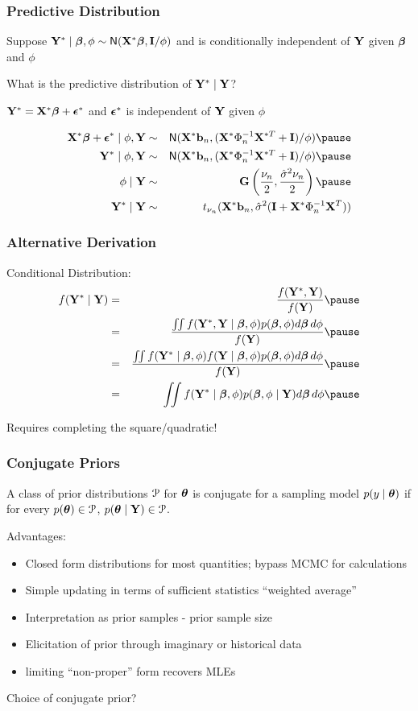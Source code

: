 \documentclass[handout]{beamer}
\begin{document}
\begin{frame}
  \frametitle{Predictive Distribution}
Suppose $\mathbf{Y}^* \mid \boldsymbol{\beta}, \phi \sim \textsf{N}(\mathbf{X}^* \boldsymbol{\beta} , \mathbf{I}/\phi)$  and is conditionally
independent of $\mathbf{Y}$ given $\boldsymbol{\beta}$ and $\phi$ \pause
\vspace{18pt}

What is the predictive distribution of $\mathbf{Y}^* \mid \mathbf{Y}$? \pause

\vspace{18pt}
$\mathbf{Y}^* = \mathbf{X}^* \boldsymbol{\beta} + \boldsymbol{\epsilon}^*$ and $\boldsymbol{\epsilon}^*$ is independent of $\mathbf{Y}$ given
$\phi$ \pause

\begin{eqnarray*}
\X^* \b + \eps^* \mid \phi, \Y & \sim & \N(\X^*\bv_n, (\X^{*} \Phi_n^{-1} \X^{*T}
+ \I)/\phi)  \pause \\
\Y^* \mid \phi, \Y & \sim & \N(\X^*\bv_n, (\X^{*} \Phi_n^{-1} \X^{*T}
+ \I)/\phi)  \pause \\
\phi \mid \Y & \sim & \G\left(\frac{\nu_n}{2},
  \frac{\shat \nu_n}{ 2} \right)  \pause \\
\Y^* \mid \Y & \sim & t_{\nu_n}( \X^*\bv_n, \shat (\I + \X^* \Phi_n^{-1} \X^T))
\end{eqnarray*}
\end{frame}
\begin{frame}
  \frametitle{Alternative Derivation}
Conditional Distribution:
\begin{eqnarray*}
f(\Y^* \mid \Y) & = & \frac{f(\Y^*, \Y)}{f(\Y)} \pause \\
 & = & \frac{
\iint f(\Y^*, \Y \mid \b, \phi) p(\b, \phi) d\b\, d\phi
}
{
  f(\Y)
}  \pause \\
 & = & \frac{
\iint f(\Y^*\mid \b, \phi) f(\Y \mid \b, \phi) p(\b, \phi) d\b\, d\phi
}
{
  f(\Y)
}  \pause \\
 & = &
\iint f(\Y^*\mid \b, \phi)  p(\b, \phi \mid \Y) d\b\, d\phi \pause
\end{eqnarray*}

Requires completing the square/quadratic!

\end{frame}

\begin{frame}
  \frametitle{Conjugate Priors}
  \begin{definition}
    A class of prior distributions ${\cal{P}}$ for $\boldsymbol{\theta}$ is conjugate for a
    sampling model $p(y \mid \boldsymbol{\theta})$ if for every $p(\boldsymbol{\theta}) \in {\cal{P}}$, $p(\boldsymbol{\theta}
    \mid \mathbf{Y}) \in {\cal{P}}$.
  \end{definition}
\pause
  Advantages: \pause
  \begin{itemize}
  \item Closed form distributions for most quantities; bypass MCMC for
    calculations \pause
  \item Simple updating in terms of sufficient statistics ``weighted
    average'' \pause
  \item Interpretation as prior samples - prior sample size \pause
  \item Elicitation of prior through imaginary or historical data \pause
  \item limiting ``non-proper'' form recovers MLEs \pause
  \end{itemize}
Choice of conjugate prior?
\end{frame}
\end{document}
